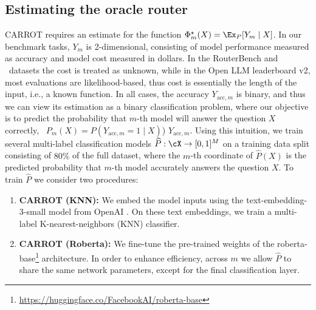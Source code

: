 \subsection{Estimating the oracle router}
CARROT requires an estimate for the function $\Phi^\star_m(X) = \Ex_P[ Y_m\mid X]$. In our benchmark tasks, $Y_m$ is 2-dimensional, consisting of model performance measured as accuracy and model cost measured in dollars. In the RouterBench and \newdata\ datasets the cost is treated as unknown, while in the Open LLM leaderboard v2, most evaluations are likelihood-based, thus cost is essentially the length of the input, i.e., a known function. In all cases, the accuracy $Y_{\text{acc}, m}$ is binary, and thus %
we can view its estimation as a binary classification problem, where our objective is to predict the probability that $m$-th model will answer the question $X$ correctly, \ie\ $P_m(X) = P(Y_{\text{acc}, m} = 1\mid X)$) $Y_{\text{acc}, m}$. Using this intuition, we train several multi-label classification models $\widehat P: \cX \to [0, 1]^M$ on a training data split consisting of $80\%$ of the full dataset, where the $m$-th coordinate of $\widehat{P}(X)$ is the predicted probability that $m$-th model accurately answers the question $X$. %
To train $\widehat P$ we consider two procedures: 
\begin{enumerate}
    \item  {\bf CARROT (KNN):} We embed the model inputs using the {text-embedding-3-small} model from OpenAI \citep{openai2023textembedding3small}. On these text embeddings, we train a multi-label K-nearest-neighbors (KNN) classifier.

    \item {\bf CARROT (Roberta):} We fine-tune the pre-trained weights of the {{roberta-base}}\footnote{\url{https://huggingface.co/FacebookAI/roberta-base}} architecture. In order to enhance efficiency, across $m$ we allow $\hat{P}$ to share the same network parameters, except for the final classification layer.
    
\end{enumerate}

